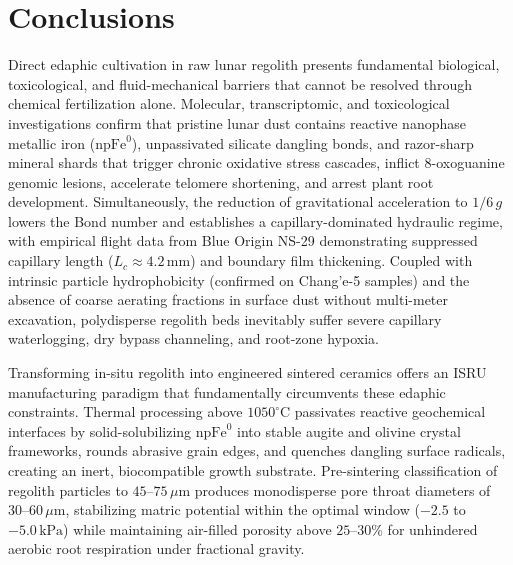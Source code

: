 \section{Conclusions}
\label{sec:conclusions}

Direct edaphic cultivation in raw lunar regolith presents fundamental biological, toxicological, and fluid-mechanical barriers that cannot be resolved through chemical fertilization alone\cite{paul2022plants,ming1989lunar,krejci2026lunar}. Molecular, transcriptomic, and toxicological investigations confirm that pristine lunar dust contains reactive nanophase metallic iron ($\mathrm{npFe}^0$), unpassivated silicate dangling bonds, and razor-sharp mineral shards that trigger chronic oxidative stress cascades, inflict 8-oxoguanine genomic lesions, accelerate telomere shortening, and arrest plant root development\cite{paul2022plants,ming1989lunar,hendrix2024reactivity,barbero2024telomere}. Simultaneously, the reduction of gravitational acceleration to $1/6\,g$ lowers the Bond number and establishes a capillary-dominated hydraulic regime, with empirical flight data from Blue Origin NS-29 demonstrating suppressed capillary length ($L_c \approx 4.2\,\mathrm{mm}$) and boundary film thickening\cite{hasenstein2026assessing}. Coupled with intrinsic particle hydrophobicity (confirmed on Chang'e-5 samples\cite{zhang2025wettability}) and the absence of coarse aerating fractions in surface dust without multi-meter excavation\cite{mckay1991lunar,zhao2023variations,hasenstein2026assessing}, polydisperse regolith beds inevitably suffer severe capillary waterlogging, dry bypass channeling, and root-zone hypoxia\cite{ming1989lunar,ostrach1982low,hasenstein2026assessing,stout2001evidence}.

Transforming in-situ regolith into engineered sintered ceramics offers an ISRU manufacturing paradigm that fundamentally circumvents these edaphic constraints\cite{ming1989lunar,taylor2005microwave}. Thermal processing above $1050^\circ\mathrm{C}$ passivates reactive geochemical interfaces by solid-solubilizing $\mathrm{npFe}^0$ into stable augite and olivine crystal frameworks, rounds abrasive grain edges, and quenches dangling surface radicals, creating an inert, biocompatible growth substrate\cite{ming1989lunar,hendrix2019measurement,xi2026multiphysics}. Pre-sintering classification of regolith particles to $45\text{--}75\,\mu\mathrm{m}$ produces monodisperse pore throat diameters of $30\text{--}60\,\mu\mathrm{m}$, stabilizing matric potential within the optimal window ($-2.5$ to $-5.0\,\mathrm{kPa}$) while maintaining air-filled porosity above $25\text{--}30\%$ for unhindered aerobic root respiration under fractional gravity\cite{ming1989lunar,heinse2007porous}.

